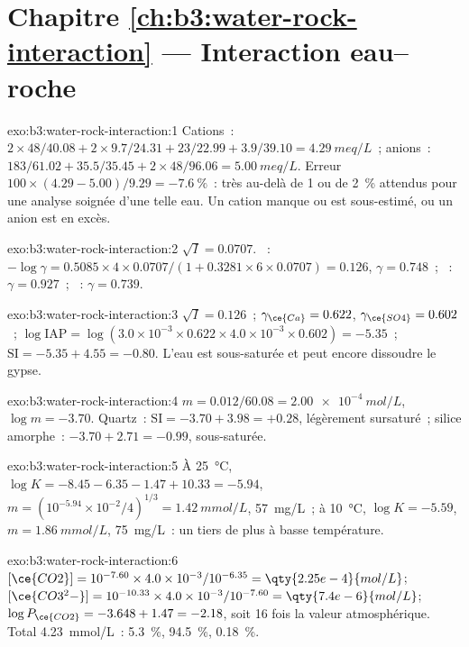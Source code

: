 \section*{Chapitre \ref{ch:b3:water-rock-interaction} --- Interaction eau--roche}

\begin{solution}{exo:b3:water-rock-interaction:1}
Cations~: $2\times48/40.08 + 2\times9.7/24.31 + 23/22.99 + 3.9/39.10 =
\qty{4.29}{meq/L}$~; anions~: $183/61.02 + 35.5/35.45 + 2\times48/96.06 =
\qty{5.00}{meq/L}$. Erreur $100\times(4.29 - 5.00)/9.29 = \qty{-7.6}{\percent}$~:
très au-delà de 1 ou de \qty{2}{\percent} attendus pour une analyse soignée d'une telle eau.
Un cation manque ou est sous-estimé, ou un anion est en excès.
\end{solution}

\begin{solution}{exo:b3:water-rock-interaction:2}
$\sqrt I = 0.0707$. ~: $-\log\gamma = 0.5085\times4\times0.0707/(1 +
0.3281\times6\times0.0707) = 0.126$, $\gamma = 0.748$~; ~: $\gamma =
0.927$~; ~: $\gamma = 0.739$.
\end{solution}

\begin{solution}{exo:b3:water-rock-interaction:3}
$\sqrt I = 0.126$~; $\gamma_{\ce{Ca}} = 0.622$, $\gamma_{\ce{SO4}} = 0.602$~;
$\log\mathrm{IAP} = \log(3.0\times10^{-3}\times0.622\times4.0\times10^{-3}
\times0.602) = -5.35$~; $\mathrm{SI} = -5.35 + 4.55 = -0.80$. L'eau est
sous-saturée et peut encore dissoudre le gypse.
\end{solution}

\begin{solution}{exo:b3:water-rock-interaction:4}
$m = 0.012/60.08 = \qty{2.00e-4}{mol/L}$, $\log m = -3.70$. Quartz~:
$\mathrm{SI} = -3.70 + 3.98 = +0.28$, légèrement sursaturé~; silice
amorphe~: $-3.70 + 2.71 = -0.99$, sous-saturée.
\end{solution}

\begin{solution}{exo:b3:water-rock-interaction:5}
À \qty{25}{\celsius}, $\log K = -8.45 - 6.35 - 1.47 + 10.33 = -5.94$, $m =
(10^{-5.94}\times10^{-2}/4)^{1/3} = \qty{1.42}{mmol/L}$, \qty{57}{mg/L}~; à
\qty{10}{\celsius}, $\log K = -5.59$, $m = \qty{1.86}{mmol/L}$,
\qty{75}{mg/L}~: un tiers de plus à basse température.
\end{solution}

\begin{solution}{exo:b3:water-rock-interaction:6}
$[\ce{CO2}] = 10^{-7.60}\times4.0\times10^{-3}/10^{-6.35} =
\qty{2.25e-4}{mol/L}$; $[\ce{CO3^2-}] = 10^{-10.33}\times4.0\times10^{-3}/
10^{-7.60} = \qty{7.4e-6}{mol/L}$; $\log P_{\ce{CO2}} = -3.648 + 1.47 =
-2.18$, soit 16 fois la valeur atmosphérique. Total \qty{4.23}{mmol/L}~: 
\qty{5.3}{\percent},  \qty{94.5}{\percent}, 
\qty{0.18}{\percent}.
\end{solution}

